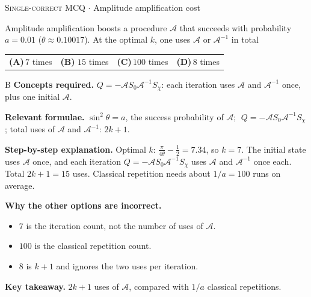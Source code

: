 \documentclass[11pt,a4paper]{article}
\newcommand{\optlabel}[1]{\textbf{(#1)}}
\newcommand{\correctlabel}[1]{\textcolor{okgreen}{\textbf{(#1)}\,\ding{51}}}
\newenvironment{qitem}[1]{\begin{list}{}{\setlength{\leftmargin}{3.3em}\setlength{\labelwidth}{3.1em}%
  \setlength{\labelsep}{0.2em}\setlength{\topsep}{3pt}\setlength{\parsep}{3pt}}\item[\textbf{Q.#1}\hfill]}{\end{list}}
\newcommand{\qsep}{\par\vspace{2pt}{\color{black!15}\hrule}\vspace{4pt}}
\newcommand{\qmeta}[2]{{\footnotesize\color{black!60}\textsc{#1} \;$\cdot$\; #2}\par}
\begin{document}
\begin{qitem}{66}
\qmeta{Single-correct MCQ}{Amplitude amplification cost}
Amplitude amplification boosts a procedure $\mathcal{A}$ that succeeds with probability $a = 0.01$ ($\theta \approx 0.10017$). At the optimal $k$, one uses $\mathcal{A}$ or $\mathcal{A}^{-1}$ in total
\par\smallskip\noindent\begin{tabularx}{\linewidth}{@{}*{4}{L}@{}}
\optlabel{A}\,$7$ times & \correctlabel{B}\,$15$ times & \optlabel{C}\,$100$ times & \optlabel{D}\,$8$ times
\end{tabularx}
\end{qitem}
\begin{solbox}{B}
\textbf{\color{brand}Concepts required.} $Q = -\mathcal{A}S_0\mathcal{A}^{-1}S_\chi$: each iteration uses $\mathcal{A}$ and $\mathcal{A}^{-1}$ once, plus one initial $\mathcal{A}$.

\textbf{\color{brand}Relevant formulae.} $\sin^2\theta = a$, the success probability of $\mathcal{A}$; $\;Q = -\mathcal{A}S_0\mathcal{A}^{-1}S_\chi$; total uses of $\mathcal{A}$ and $\mathcal{A}^{-1}$: $2k + 1$.

\textbf{\color{brand}Step-by-step explanation.} Optimal $k$: $\frac{\pi}{4\theta} - \frac12 = 7.34$, so $k = 7$. The initial state uses $\mathcal{A}$ once, and each iteration $Q = -\mathcal{A}S_0\mathcal{A}^{-1}S_\chi$ uses $\mathcal{A}$ and $\mathcal{A}^{-1}$ once each. Total $2k + 1 = 15$ uses.
Classical repetition needs about $1/a = 100$ runs on average.

\textbf{\color{brand}Why the other options are incorrect.}
\begin{itemize}[leftmargin=2.4em, itemsep=1pt, topsep=2pt]
\item[\textbf{(A)}] $7$ is the iteration count, not the number of uses of $\mathcal{A}$.
\item[\textbf{(C)}] $100$ is the classical repetition count.
\item[\textbf{(D)}] $8$ is $k + 1$ and ignores the two uses per iteration.
\end{itemize}
\textbf{\color{brand}Key takeaway.} $2k + 1$ uses of $\mathcal{A}$, compared with $1/a$ classical repetitions.
\end{solbox}
\qsep
\end{document}
